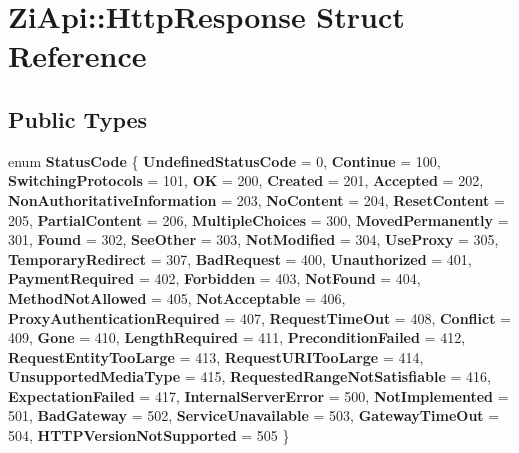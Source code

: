 \hypertarget{structZiApi_1_1HttpResponse}{}\section{Zi\+Api\+::Http\+Response Struct Reference}
\label{structZiApi_1_1HttpResponse}
\subsection*{Public Types}
\begin{DoxyCompactItemize}
\item 
\mbox{\label{structZiApi_1_1HttpResponse_aa304ae6c6c8d12f651eafc75fb203d90}} 
enum {\bfseries Status\+Code} \{ \newline
{\bfseries Undefined\+Status\+Code} = 0, 
{\bfseries Continue} = 100, 
{\bfseries Switching\+Protocols} = 101, 
{\bfseries OK} = 200, 
\newline
{\bfseries Created} = 201, 
{\bfseries Accepted} = 202, 
{\bfseries Non\+Authoritative\+Information} = 203, 
{\bfseries No\+Content} = 204, 
\newline
{\bfseries Reset\+Content} = 205, 
{\bfseries Partial\+Content} = 206, 
{\bfseries Multiple\+Choices} = 300, 
{\bfseries Moved\+Permanently} = 301, 
\newline
{\bfseries Found} = 302, 
{\bfseries See\+Other} = 303, 
{\bfseries Not\+Modified} = 304, 
{\bfseries Use\+Proxy} = 305, 
\newline
{\bfseries Temporary\+Redirect} = 307, 
{\bfseries Bad\+Request} = 400, 
{\bfseries Unauthorized} = 401, 
{\bfseries Payment\+Required} = 402, 
\newline
{\bfseries Forbidden} = 403, 
{\bfseries Not\+Found} = 404, 
{\bfseries Method\+Not\+Allowed} = 405, 
{\bfseries Not\+Acceptable} = 406, 
\newline
{\bfseries Proxy\+Authentication\+Required} = 407, 
{\bfseries Request\+Time\+Out} = 408, 
{\bfseries Conflict} = 409, 
{\bfseries Gone} = 410, 
\newline
{\bfseries Length\+Required} = 411, 
{\bfseries Precondition\+Failed} = 412, 
{\bfseries Request\+Entity\+Too\+Large} = 413, 
{\bfseries Request\+U\+R\+I\+Too\+Large} = 414, 
\newline
{\bfseries Unsupported\+Media\+Type} = 415, 
{\bfseries Requested\+Range\+Not\+Satisfiable} = 416, 
{\bfseries Expectation\+Failed} = 417, 
{\bfseries Internal\+Server\+Error} = 500, 
\newline
{\bfseries Not\+Implemented} = 501, 
{\bfseries Bad\+Gateway} = 502, 
{\bfseries Service\+Unavailable} = 503, 
{\bfseries Gateway\+Time\+Out} = 504, 
\newline
{\bfseries H\+T\+T\+P\+Version\+Not\+Supported} = 505
 \}
\end{DoxyCompactItemize}
